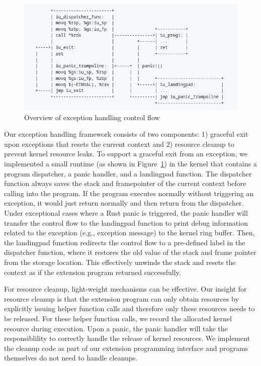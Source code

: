 \begin{figure}
	\includegraphics[width=0.8\linewidth]{figs/EH.png}
	\centering
	\vspace{-10pt}
	\caption{Overview of exception handling control flow}
	\label{fig:eh-overview}
	\vspace{-10pt}
\end{figure}

Our exception handling framework consists of two components: 1) graceful exit
    upon exceptions that resets the current context and 2) resource cleanup to
    prevent kernel resource leaks.
To support a graceful exit from an exception, we implemented a small runtime
    (as shown in Figure~\ref{fig:eh-overview}) in the kernel that contains a
    program dispatcher, a panic handler, and a landingpad function.
The dispatcher function always saves the stack and framepointer of the current
    context before calling into the program.
If the program executes normally without triggering an exception, it would just
    return normally and then return from the dispatcher.
Under exceptional cases where a Rust panic is triggered, the panic handler will
    transfer the control flow to the landingpad function to print debug
    information related to the exception (e.g., exception message) to the
    kernel ring buffer.
Then, the landingpad function redirects the control flow to a pre-defined label
    in the dispatcher function, where it restores the old value of the stack
    and frame pointer from the storage location.
This effectively unwinds the stack and resets the context as if the extension
    program returned successfully.

For resource cleanup, light-weight mechanisms can be effective.
Our insight for resource cleanup is that the extension program can only obtain
    resources by explicitly issuing helper function calls and therefore only
    these resources needs to be released.
For these helper function calls, we record the allocated kernel resource during
    execution.
Upon a panic, the panic handler will take the responsiblility to correctly
    handle the release of kernel resources.
We implement the cleanup code as part of our extension programming interface
    and programs themselves do not need to handle cleanups.

